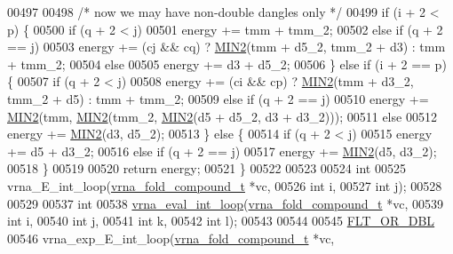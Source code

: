 \begin{DoxyCode}
00497 
00498   \textcolor{comment}{/* now we may have non-double dangles only */}
00499   \textcolor{keywordflow}{if} (i + 2 < p) \{
00500     \textcolor{keywordflow}{if} (q + 2 < j)
00501       energy += tmm + tmm\_2;
00502     \textcolor{keywordflow}{else} \textcolor{keywordflow}{if} (q + 2 == j)
00503       energy += (cj && cq) ? \hyperlink{group__utils_gae0b9cd0ce090bd69b951aa73e8fa4f7d}{MIN2}(tmm + d5\_2, tmm\_2 + d3) : tmm + tmm\_2;
00504     \textcolor{keywordflow}{else}
00505       energy += d3 + d5\_2;
00506   \} \textcolor{keywordflow}{else} \textcolor{keywordflow}{if} (i + 2 == p) \{
00507     \textcolor{keywordflow}{if} (q + 2 < j)
00508       energy += (ci && cp) ? \hyperlink{group__utils_gae0b9cd0ce090bd69b951aa73e8fa4f7d}{MIN2}(tmm + d3\_2, tmm\_2 + d5) : tmm + tmm\_2;
00509     \textcolor{keywordflow}{else} \textcolor{keywordflow}{if} (q + 2 == j)
00510       energy += \hyperlink{group__utils_gae0b9cd0ce090bd69b951aa73e8fa4f7d}{MIN2}(tmm, \hyperlink{group__utils_gae0b9cd0ce090bd69b951aa73e8fa4f7d}{MIN2}(tmm\_2, \hyperlink{group__utils_gae0b9cd0ce090bd69b951aa73e8fa4f7d}{MIN2}(d5 + d5\_2, d3 + d3\_2)));
00511     \textcolor{keywordflow}{else}
00512       energy += \hyperlink{group__utils_gae0b9cd0ce090bd69b951aa73e8fa4f7d}{MIN2}(d3, d5\_2);
00513   \} \textcolor{keywordflow}{else} \{
00514     \textcolor{keywordflow}{if} (q + 2 < j)
00515       energy += d5 + d3\_2;
00516     \textcolor{keywordflow}{else} \textcolor{keywordflow}{if} (q + 2 == j)
00517       energy += \hyperlink{group__utils_gae0b9cd0ce090bd69b951aa73e8fa4f7d}{MIN2}(d5, d3\_2);
00518   \}
00519 
00520   \textcolor{keywordflow}{return} energy;
00521 \}
00522 
00523 
00524 \textcolor{keywordtype}{int}
00525 vrna\_E\_int\_loop(\hyperlink{group__fold__compound_structvrna__fc__s}{vrna\_fold\_compound\_t}  *vc,
00526                 \textcolor{keywordtype}{int}                   i,
00527                 \textcolor{keywordtype}{int}                   j);
00528 
00529 
00537 \textcolor{keywordtype}{int}
00538 \hyperlink{group__loops_ga018f1314dbbae42fdd27c94670b61721}{vrna\_eval\_int\_loop}(\hyperlink{group__fold__compound_structvrna__fc__s}{vrna\_fold\_compound\_t} *vc,
00539                    \textcolor{keywordtype}{int}                  i,
00540                    \textcolor{keywordtype}{int}                  j,
00541                    \textcolor{keywordtype}{int}                  k,
00542                    \textcolor{keywordtype}{int}                  l);
00543 
00544 
00545 \hyperlink{group__data__structures_ga31125aeace516926bf7f251f759b6126}{FLT\_OR\_DBL}
00546 vrna\_exp\_E\_int\_loop(\hyperlink{group__fold__compound_structvrna__fc__s}{vrna\_fold\_compound\_t}  *vc,

\end{DoxyCode}
